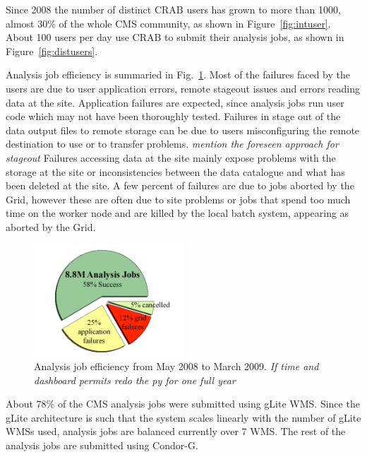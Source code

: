 Since 2008 the number of distinct CRAB users has grown to more than 1000, almost 30\% of the whole CMS
community, as shown in Figure~\ref{fig:intuser}. About 100 users per day use CRAB to submit their analysis jobs, 
as shown in Figure~\ref{fig:distusers}.


Analysis job efficiency is summaried in Fig.~\ref{fig:AnalysisJobEffMay08March09}. Most of the failures faced by the users are due to user application errors, remote stageout issues and errors reading data at the site. Application failures are expected, since analysis jobs run user code which may not have been
thoroughly tested.  Failures in stage out of the data output files to
remote storage can be due to users misconfiguring the remote
destination to use or to transfer problems. \emph{mention the foreseen approach for stageout}
Failures accessing data at the site mainly expose problems with the storage at the site or
inconsistencies between the data catalogue and what has been deleted at the site.  
A few percent of failures are due to jobs aborted by the Grid, however these are often due to site problems or jobs that spend
too much time on the worker node and are killed by the local batch system, appearing as aborted by the Grid.

\begin{figure}
\includegraphics[width=0.5\textwidth]{figures/AnalysisJobEffMay08March09.png}
\caption{Analysis job efficiency from May 2008 to March 2009. \emph{If time and dashboard permits redo the py for one full year} }
\label{fig:AnalysisJobEffMay08March09}
\end{figure}

About 78\% of the CMS analysis jobs were submitted using gLite WMS.  Since the gLite architecture is such that the system scales linearly with the number of gLite WMSs used, analysis jobs are balanced currently over 7
WMS. The rest of the analysis jobs are submitted using Condor-G.

